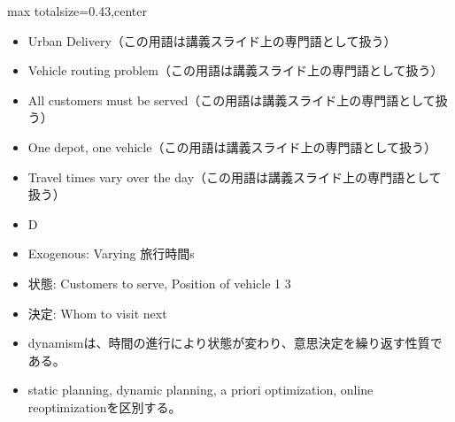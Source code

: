 \clearpage
{}
\begin{minipage}[t]{0.405\textwidth}
\begin{adjustbox}{max totalsize={\textwidth}{0.43\textheight},center}
\begin{minipage}{\textwidth}\scriptsize
{}\begin{itemize}
\item Urban Delivery（この用語は講義スライド上の専門語として扱う）
\item Vehicle routing problem（この用語は講義スライド上の専門語として扱う）
\item All customers must be served（この用語は講義スライド上の専門語として扱う）
\item One depot, one vehicle（この用語は講義スライド上の専門語として扱う）
\item Travel times vary over the day（この用語は講義スライド上の専門語として扱う）
\item D
\item Exogenous: Varying 旅行時間s
\item 状態: Customers to serve, Position of vehicle 1 3
\item 決定: Whom to visit next
\end{itemize}\begin{itemize}
\item dynamismは、時間の進行により状態が変わり、意思決定を繰り返す性質である。
\item static planning, dynamic planning, a priori optimization, online reoptimizationを区別する。
\end{itemize}
\end{minipage}
\end{adjustbox}
\end{minipage}\hfill
